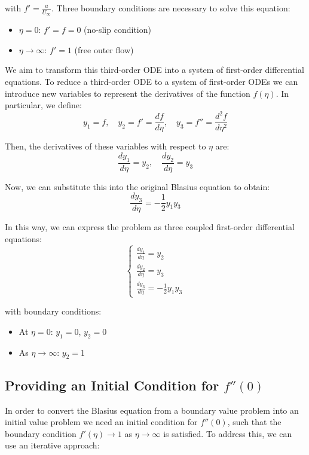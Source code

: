 \documentclass{article}
\begin{document}
with \( f' = \frac{u}{U_\infty} \). Three boundary conditions are necessary to solve this equation:
\begin{itemize}
    \item \( \eta = 0 \): \( f' = f = 0 \) (no-slip condition)
    \item \( \eta \to \infty \): \( f' = 1 \) (free outer flow)
\end{itemize}

We aim to transform this third-order ODE into a system of first-order differential equations. To reduce a third-order ODE to a 
system of first-order ODEs we can introduce new variables to represent the derivatives of the function \( f(\eta) \). 
In particular, we define:
\[
y_1 = f, \quad y_2 = f' = \frac{df}{d\eta}, \quad y_3 = f'' = \frac{d^2 f}{d\eta^2}
\]

Then, the derivatives of these variables with respect to \(\eta\) are:
\[
\frac{dy_1}{d\eta} = y_2, \quad \frac{dy_2}{d\eta} = y_3
\]

Now, we can substitute this into the original Blasius equation to obtain:
\[
\frac{dy_3}{d\eta} = -\frac{1}{2} y_1 y_3
\]

In this way, we can express the problem as three coupled first-order differential equations:
\[
\begin{cases}
\frac{dy_1}{d\eta} = y_2 \\
\frac{dy_2}{d\eta} = y_3 \\
\frac{dy_3}{d\eta} = -\frac{1}{2} y_1 y_3
\end{cases}
\]

with boundary conditions:
\begin{itemize}
    \item At \( \eta = 0 \): \( y_1 = 0 \), \( y_2 = 0 \)
    \item As \( \eta \to \infty \): \( y_2 = 1 \)
\end{itemize}

\subsection{Providing an Initial Condition for \( f''(0)\)}

In order to convert the Blasius equation from a boundary value problem into an initial value problem we need an initial condition for \( f''(0) \),
such that the boundary condition \( f'(\eta) \rightarrow 1 \) as \( \eta \rightarrow \infty \) is satisfied. To address this, we can use an iterative approach:
\end{document}
